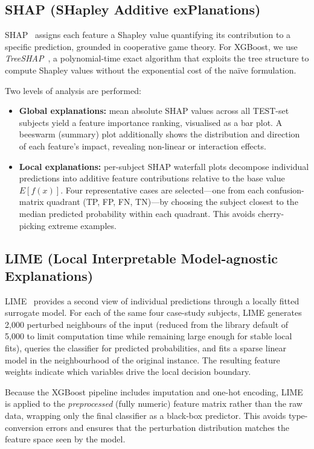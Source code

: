 \subsection{SHAP (SHapley Additive exPlanations)}
\label{subsec:methods_shap}
\gls{SHAP}~\cite{lundberg2017shap} assigns each feature a Shapley value quantifying its contribution to a specific prediction, grounded in cooperative game theory.
For XGBoost, we use \textit{TreeSHAP}~\cite{lundberg2020treeshap}, a polynomial-time exact algorithm that exploits the tree structure to compute Shapley values without the exponential cost of the na\"ive formulation.

Two levels of analysis are performed:
\begin{itemize}
  \item \textbf{Global explanations:} mean absolute \gls{SHAP} values across all \gls{TEST}-set subjects yield a feature importance ranking, visualised as a bar plot.
    A beeswarm (summary) plot additionally shows the distribution and direction of each feature's impact, revealing non-linear or interaction effects.
  \item \textbf{Local explanations:} per-subject \gls{SHAP} waterfall plots decompose individual predictions into additive feature contributions relative to the base value $E[f(x)]$.
    Four representative cases are selected---one from each confusion-matrix quadrant (\gls{TP}, \gls{FP}, \gls{FN}, \gls{TN})---by choosing the subject closest to the median predicted probability within each quadrant.
    This avoids cherry-picking extreme examples.
\end{itemize}

\subsection{LIME (Local Interpretable Model-agnostic Explanations)}
\label{subsec:methods_lime}
\gls{LIME}~\cite{ribeiro2016lime} provides a second view of individual predictions through a locally fitted surrogate model.
For each of the same four case-study subjects, \gls{LIME} generates 2{,}000 perturbed neighbours of the input (reduced from the library default of 5{,}000 to limit computation time while remaining large enough for stable local fits), queries the classifier for predicted probabilities, and fits a sparse linear model in the neighbourhood of the original instance.
The resulting feature weights indicate which variables drive the local decision boundary.

Because the XGBoost pipeline includes imputation and one-hot encoding, \gls{LIME} is applied to the \textit{preprocessed} (fully numeric) feature matrix rather than the raw data, wrapping only the final classifier as a black-box predictor.
This avoids type-conversion errors and ensures that the perturbation distribution matches the feature space seen by the model.

